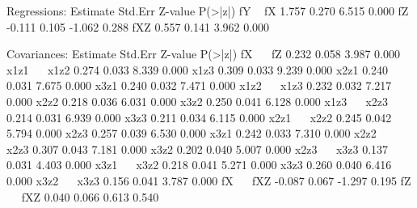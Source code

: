 \begin{Schunk}
\begin{Soutput}
Regressions:
                   Estimate  Std.Err  Z-value  P(>|z|)
  fY ~                                                
    fX                1.757    0.270    6.515    0.000
    fZ               -0.111    0.105   -1.062    0.288
    fXZ               0.557    0.141    3.962    0.000

Covariances:
                   Estimate  Std.Err  Z-value  P(>|z|)
  fX ~~                                               
    fZ                0.232    0.058    3.987    0.000
  x1z1 ~~                                             
    x1z2              0.274    0.033    8.339    0.000
    x1z3              0.309    0.033    9.239    0.000
    x2z1              0.240    0.031    7.675    0.000
    x3z1              0.240    0.032    7.471    0.000
  x1z2 ~~                                             
    x1z3              0.232    0.032    7.217    0.000
    x2z2              0.218    0.036    6.031    0.000
    x3z2              0.250    0.041    6.128    0.000
  x1z3 ~~                                             
    x2z3              0.214    0.031    6.939    0.000
    x3z3              0.211    0.034    6.115    0.000
  x2z1 ~~                                             
    x2z2              0.245    0.042    5.794    0.000
    x2z3              0.257    0.039    6.530    0.000
    x3z1              0.242    0.033    7.310    0.000
  x2z2 ~~                                             
    x2z3              0.307    0.043    7.181    0.000
    x3z2              0.202    0.040    5.007    0.000
  x2z3 ~~                                             
    x3z3              0.137    0.031    4.403    0.000
  x3z1 ~~                                             
    x3z2              0.218    0.041    5.271    0.000
    x3z3              0.260    0.040    6.416    0.000
  x3z2 ~~                                             
    x3z3              0.156    0.041    3.787    0.000
  fX ~~                                               
    fXZ              -0.087    0.067   -1.297    0.195
  fZ ~~                                               
    fXZ               0.040    0.066    0.613    0.540


\end{Soutput}
\end{Schunk}
